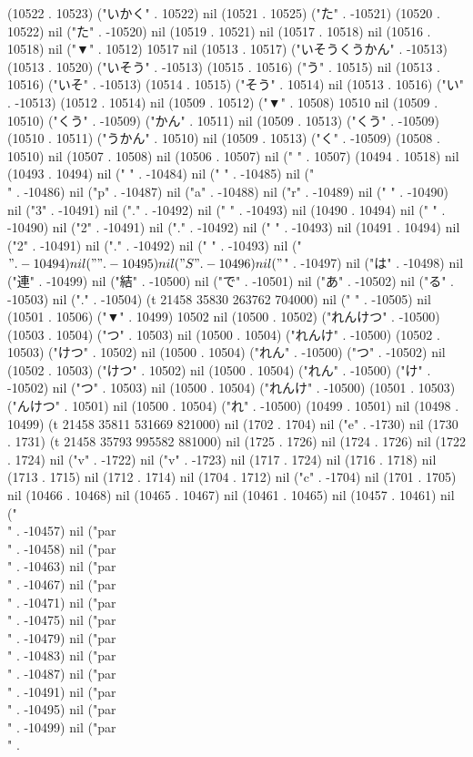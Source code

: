 (10522 . 10523) ("いかく" . 10522) nil (10521 . 10525) ("た" . -10521) (10520 . 10522) nil ("た" . -10520) nil (10519 . 10521) nil (10517 . 10518) nil (10516 . 10518) nil ("▼" . 10512) 10517 nil (10513 . 10517) ("いそうくうかん" . -10513) (10513 . 10520) ("いそう" . -10513) (10515 . 10516) ("う" . 10515) nil (10513 . 10516) ("いそ" . -10513) (10514 . 10515) ("そう" . 10514) nil (10513 . 10516) ("い" . -10513) (10512 . 10514) nil (10509 . 10512) ("▼" . 10508) 10510 nil (10509 . 10510) ("くう" . -10509) ("かん" . 10511) nil (10509 . 10513) ("くう" . -10509) (10510 . 10511) ("うかん" . 10510) nil (10509 . 10513) ("く" . -10509) (10508 . 10510) nil (10507 . 10508) nil (10506 . 10507) nil (" " . 10507) (10494 . 10518) nil (10493 . 10494) nil ("
" . -10484) nil (" " . -10485) nil ("\\" . -10486) nil ("p" . -10487) nil ("a" . -10488) nil ("r" . -10489) nil (" " . -10490) nil ("3" . -10491) nil ("." . -10492) nil (" " . -10493) nil (10490 . 10494) nil (" " . -10490) nil ("2" . -10491) nil ("." . -10492) nil (" " . -10493) nil (10491 . 10494) nil ("2" . -10491) nil ("." . -10492) nil (" " . -10493) nil ("$" . -10494) nil ("\\" . -10495) nil ("S" . -10496) nil ("$" . -10497) nil ("は" . -10498) nil ("連" . -10499) nil ("結" . -10500) nil ("で" . -10501) nil ("あ" . -10502) nil ("る" . -10503) nil ("." . -10504) (t 21458 35830 263762 704000) nil (" " . -10505) nil (10501 . 10506) ("▼" . 10499) 10502 nil (10500 . 10502) ("れんけつ" . -10500) (10503 . 10504) ("つ" . 10503) nil (10500 . 10504) ("れんけ" . -10500) (10502 . 10503) ("けつ" . 10502) nil (10500 . 10504) ("れん" . -10500) ("つ" . -10502) nil (10502 . 10503) ("けつ" . 10502) nil (10500 . 10504) ("れん" . -10500) ("け" . -10502) nil ("つ" . 10503) nil (10500 . 10504) ("れんけ" . -10500) (10501 . 10503) ("んけつ" . 10501) nil (10500 . 10504) ("れ" . -10500) (10499 . 10501) nil (10498 . 10499) (t 21458 35811 531669 821000) nil (1702 . 1704) nil ("e" . -1730) nil (1730 . 1731) (t 21458 35793 995582 881000) nil (1725 . 1726) nil (1724 . 1726) nil (1722 . 1724) nil ("v" . -1722) nil ("v" . -1723) nil (1717 . 1724) nil (1716 . 1718) nil (1713 . 1715) nil (1712 . 1714) nil (1704 . 1712) nil ("c" . -1704) nil (1701 . 1705) nil (10466 . 10468) nil (10465 . 10467) nil (10461 . 10465) nil (10457 . 10461) nil ("\\" . -10457) nil ("par \\" . -10458) nil ("par\\" . -10463) nil ("par\\" . -10467) nil ("par\\" . -10471) nil ("par\\" . -10475) nil ("par\\" . -10479) nil ("par\\" . -10483) nil ("par\\" . -10487) nil ("par\\" . -10491) nil ("par\\" . -10495) nil ("par\\" . -10499) nil ("par\\" . 